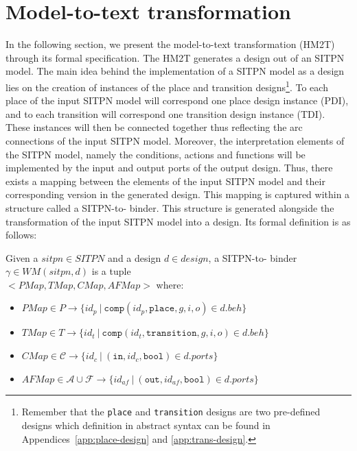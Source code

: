 \section{Model-to-text transformation}
\label{sec:m2t}

In the following section, we present the \hilecop{} model-to-text
transformation (HM2T) through its formal specification.  The HM2T
generates a \hvhdl{} design out of an SITPN model.  The main idea
behind the implementation of a SITPN model as a \hvhdl{} design lies
on the creation of instances of the place and transition
designs\footnote{Remember that the \texttt{place} and
  \texttt{transition} designs are two pre-defined designs which
  definition in abstract syntax can be found in
  Appendices~\ref{app:place-design} and \ref{app:trans-design}.}. To
each place of the input SITPN model will correspond one place design
instance (PDI), and to each transition will correspond one transition
design instance (TDI). These instances will then be connected together
thus reflecting the arc connections of the input SITPN
model. Moreover, the interpretation elements of the SITPN model,
namely the conditions, actions and functions will be implemented by
the input and output ports of the output design. Thus, there exists a
mapping between the elements of the input SITPN model and their
corresponding version in the generated \hvhdl{} design. This mapping
is captured within a structure called a SITPN-to-\hvhdl{} binder.
This structure is generated alongside the transformation of the input
SITPN model into a \hvhdl{} design. Its formal definition is as
follows:
\begin{definition}
  \label{def:sitpn-to-hvhdl-binder}
  Given a $sitpn\in{}SITPN$ and a \hvhdl{} design $d\in{}design$, a
  SITPN-to-\hvhdl{} binder $\gamma\in{}WM(sitpn,d)$ is a tuple\\
  ${<}PMap,TMap,CMap,AFMap{>}$ where:
  \begin{itemize}
  \item $PMap\in{}P\rightarrow{}\{id_p~|~\mathtt{comp}(id_p,\mathtt{place},g,i,o)\in{}d.beh\}$
  \item $TMap\in{}T\rightarrow{}\{id_t~|~\mathtt{comp}(id_t,\mathtt{transition},g,i,o)\in{}d.beh\}$
  \item $CMap\in\mathcal{C}\rightarrow\{id_c~|~(\mathtt{in}, id_c, \mathtt{bool})\in{}d.ports\}$
  \item $AFMap\in\mathcal{A}\cup\mathcal{F}\rightarrow\{id_{af}~|~(\mathtt{out}, id_{af}, \mathtt{bool})\in{}d.ports\}$
  \end{itemize}
\end{definition}


